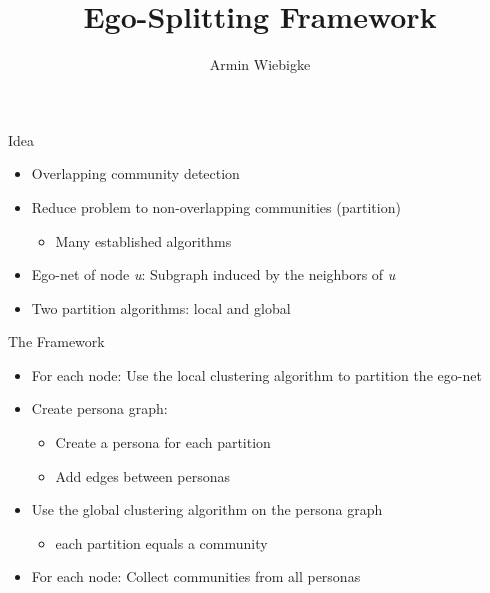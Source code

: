 \documentclass[11pt]{beamer}
\begin{document}
	\author{Armin Wiebigke}
	\title{Ego-Splitting Framework}
	\begin{frame}[plain]
	\maketitle
\end{frame}

\begin{frame}{Idea}
\begin{itemize}
	\item Overlapping community detection
	\item Reduce problem to non-overlapping communities (partition)
	\begin{itemize}
		\item Many established algorithms
	\end{itemize}
	\item Ego-net of node \textit{u}: Subgraph induced by the neighbors of \textit{u}
	\item Two partition algorithms: local and global
\end{itemize}
\end{frame}


\begin{frame}{The Framework}
\begin{itemize}
	 \item For each node: Use the local clustering algorithm to partition the ego-net
	 \item Create persona graph:
	 \begin{itemize}
	 	\item Create a persona for each partition
	 	\item Add edges between personas
	 \end{itemize}
	 \item Use the global clustering algorithm on the persona graph
	 \begin{itemize}
	 	\item each partition equals a community
	 \end{itemize}
	 \item For each node: Collect communities from all personas
\end{itemize}
\end{frame}
\end{document}

